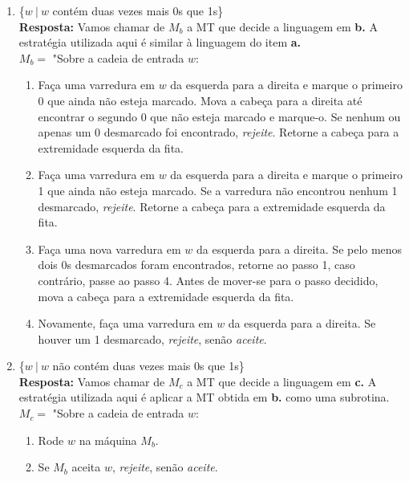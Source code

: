 \begin{enumerate}[label={\textbf{\alph*.}}]
\item \{$w\ |\ w$ contém duas vezes mais 0s que 1s\}\\[3pt]
\textbf{Resposta: } Vamos chamar de $M_b$ a MT que decide a linguagem em \textbf{b.} A estratégia utilizada aqui é similar à linguagem do item \textbf{a.}\\[3pt]
$M_b = $ "Sobre a cadeia de entrada $w$:
\begin{enumerate}[label={\textbf{\arabic*.}}, leftmargin=1in]
\item Faça uma varredura em $w$ da esquerda para a direita e marque o primeiro 0 que ainda não esteja marcado. Mova a cabeça para a direita até encontrar o segundo 0 que não esteja marcado e marque-o. Se nenhum ou apenas um 0 desmarcado foi encontrado, \textit{rejeite}. Retorne a cabeça para a extremidade esquerda da fita.
\item Faça uma varredura em $w$ da esquerda para a direita e marque o primeiro 1 que ainda não esteja marcado. Se a varredura não encontrou nenhum 1 desmarcado, \textit{rejeite}. Retorne a cabeça para a extremidade esquerda da fita.
\item Faça uma nova varredura em $w$ da esquerda para a direita. Se pelo menos dois 0s desmarcados foram encontrados, retorne ao passo 1, caso contrário, passe ao passo 4. Antes de mover-se para o passo decidido, mova a cabeça para a extremidade esquerda da fita.
\item Novamente, faça uma varredura em $w$ da esquerda para a direita. Se houver um 1 desmarcado, \textit{rejeite}, senão \textit{aceite}.
\end{enumerate}

\item \{$w\ |\ w$ não contém duas vezes mais 0s que 1s\}\\[3pt]
\textbf{Resposta: } Vamos chamar de $M_c$ a MT que decide a linguagem em \textbf{c.} A estratégia utilizada aqui é aplicar a MT obtida em \textbf{b.} como uma subrotina.\\[3pt]
$M_c = $ "Sobre a cadeia de entrada $w$:
\begin{enumerate}[label={\textbf{\arabic*.}}, leftmargin=1in]
\item Rode $w$ na máquina $M_b$.
\item Se $M_b$ aceita $w$, \textit{rejeite}, senão \textit{aceite}.
\end{enumerate}
\end{enumerate}